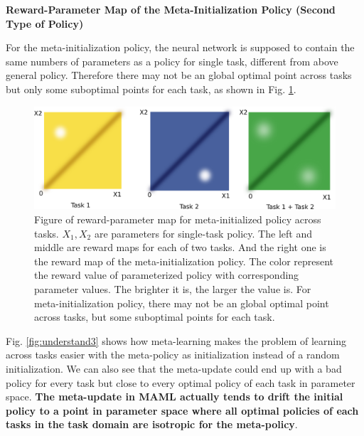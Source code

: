 \documentclass{article}
\begin{document}
\textbf{Reward-Parameter Map of the Meta-Initialization Policy (Second Type of Policy)}

For the meta-initialization policy, the neural network is supposed to contain the same numbers of parameters as a policy for single task, different from above general policy. Therefore there may not be an global optimal point across tasks but only some suboptimal points for each task, as shown in Fig. \ref{fig:understand2}.
\begin{figure}[htbp]
	\centering
	\includegraphics[scale=0.3]{img/understand2.png}
	\caption{Figure of reward-parameter map for meta-initialized policy across tasks. $X_1, X_2$ are parameters for single-task policy. The left and middle are reward maps for each of two tasks. And the right one is the reward map of the meta-initialization policy. The color represent the reward value of parameterized policy with corresponding parameter values. The brighter it is, the larger the value is. For meta-initialization policy, there may not be an global optimal point across tasks, but some suboptimal points for each task.}
	\label{fig:understand2}
\end{figure}

Fig. \ref{fig:understand3} shows how meta-learning makes the problem of learning across tasks easier with the meta-policy as initialization instead of a random initialization. We can also see that the meta-update could end up with a bad policy for every task but close to every optimal policy of each task in parameter space. \textbf{The meta-update in MAML actually tends to drift the initial policy to a point in parameter space where all optimal policies of each tasks in the task domain are isotropic for the meta-policy}.
\end{document}
